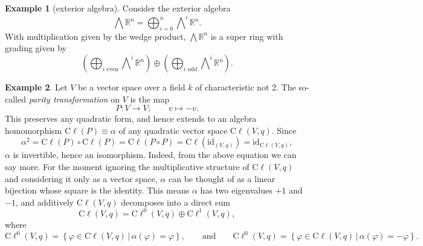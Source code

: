 \documentclass[a4paper,10pt]{scrreprt}
\newcommand{\R}{\mathbb{R}}
\newcommand{\cliff}{\mathrm{C}\ell}
\theoremstyle{definition}
\newtheorem{example}{Example}[section]
\theoremstyle{plain}
\theoremstyle{remark}
\begin{document}
\begin{example}[exterior algebra]
  \label{eg:exterioralgebra}
  Consider the exterior algebra
  \begin{equation*}
    \bigwedge \R^{n} = \bigoplus_{i=0}^{n} \bigwedge\nolimits^{i} \R^{n}.
  \end{equation*}
  With multiplication given by the wedge product, $\bigwedge \R^{n}$ is a super ring with grading given by
  \begin{equation*}
    \left( \bigoplus_{i\text{ even}} \bigwedge\nolimits^{i}\R^{n} \right) \oplus \left( \bigoplus_{i\text{ odd}}\bigwedge\nolimits^{i}\R^{n} \right).
  \end{equation*}
\end{example}

\begin{example}
  Let $V$ be a vector space over a field $k$ of characteristic not 2. The so-called \emph{parity transformation} on $V$ is the map
  \begin{equation*}
    P\colon V \to V;\qquad v \mapsto -v.
  \end{equation*}
  This preserves any quadratic form, and hence extends to an algebra homomorphism $\cliff(P) \equiv \alpha$ of any quadratic vector space $\cliff(V,q)$. Since 
  \begin{equation*}
    \alpha^2 = \cliff(P) \circ \cliff(P) = \cliff(P \circ P) = \cliff(\mathrm{id}_{(V,q)}) = \mathrm{id}_{\cliff(V,q)},
  \end{equation*}
  $\alpha$ is invertible, hence an isomorphism. Indeed, from the above equation we can say more. For the moment ignoring the multiplicative structure of $\cliff(V,q)$ and considering it only as a vector space, $\alpha$ can be thought of as a linear bijection whose square is the identity. This means $\alpha$ has two eigenvalues $+1$ and $-1$, and additively $\cliff(V,q)$ decomposes into a direct sum
  \begin{equation*}
    \cliff(V,q) = \cliff^{0}(V,q) \oplus \cliff^{1}(V,q),
  \end{equation*}
  where 
  \begin{equation*}
    \cliff^{0}(V,q) = \left\{ \varphi \in \cliff(V,q)\,\big|\, \alpha(\varphi) = \varphi \right\},\qquad\text{and} \qquad\cliff^{0}(V,q) = \left\{ \varphi \in \cliff(V,q)\,\big|\, \alpha(\varphi) = -\varphi \right\}.
  \end{equation*}


\end{example}
\end{document}
